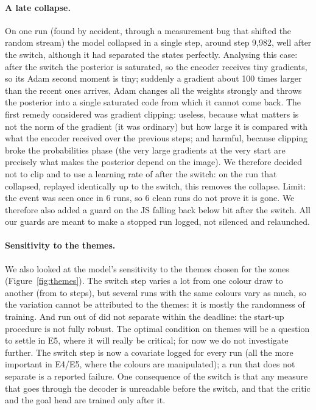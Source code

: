\documentclass[10pt]{article}
\begin{document}
\paragraph{A late collapse.}
On one run (found by accident, through a measurement bug that shifted the random stream) the model collapsed in a single
step, around step 9,982, well after the switch, although it had separated the states perfectly. %
Analysing this case: after the switch the posterior is saturated, so the encoder receives tiny gradients, so its Adam
second moment is tiny; suddenly a gradient about 100 times larger than the recent ones arrives, Adam changes all the %
weights strongly and throws the posterior into a single saturated code from which it cannot come back.
The first remedy considered was gradient clipping: useless, because what matters is not the norm of the gradient (it was
ordinary) but how large it is compared with what the encoder received over the previous steps; and harmful, because
clipping broke the probabilities phase (the very large gradients at the very start are precisely what makes the
posterior depend on the image).
We therefore decided not to clip and to use a learning rate of \eThreeLrAfterSwitch{} after the switch: on the run that
collapsed, replayed identically up to the switch, this removes the collapse.
Limit: the event was seen once in 6 runs, so 6 clean runs do not prove it is gone. %
We therefore also added a guard on the JS falling back below \eThreeCollapseJS{} bit after the switch.
All our guards are meant to make a stopped run logged, not silenced and relaunched.

\paragraph{Sensitivity to the themes.}
We also looked at the model's sensitivity to the themes chosen for the zones (Figure~\ref{fig:themes}).
The switch step varies a lot from one colour draw to another (from \eThreeThemeSwitchMin{} to \eThreeThemeSwitchMax{}
steps), but several runs with the same colours vary as much, so the variation cannot be attributed to the themes: it is
mostly the randomness of training.
And \eThreeThemeCensored{} run out of \eThreeThemeRuns{} did not separate within the deadline: the start-up procedure is
not fully robust.
The optimal condition on themes will be a question to settle in E5, where it will really be critical; for now we do not
investigate further.
The switch step is now a covariate logged for every run (all the more important in E4/E5, where the colours are
manipulated); a run that does not separate is a reported failure.
One consequence of the switch is that any measure that goes through the decoder is unreadable before the switch, and
that the critic and the goal head are trained only after it.
\end{document}
